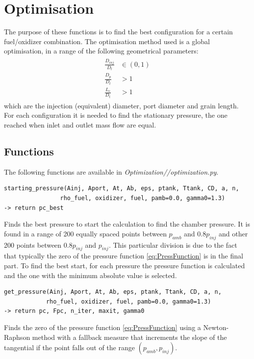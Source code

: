 \newpage
\chapter{Optimisation}
The purpose of these functions is to find the best configuration for a certain fuel/oxidizer combination.
The optimisation method used is a global optimisation, in a range of the following geometrical parameters:
\begin{gather}
\begin{align}
	\frac{D_{inj}}{D_t} &\in (0,1)\\
	\frac{D_{p}}{D_t} &> 1\\
	\frac{L_c}{D_t} &> 1
\end{align}
\end{gather}
which are the injection (equivalent) diameter, port diameter and grain length.\\
For each configuration it is needed to find the stationary pressure, the one reached when inlet and
outlet mass flow are equal.
\section{Functions}
The following functions are available in \textit{Optimization//optimization.py}.
\begin{verbatim}
starting_pressure(Ainj, Aport, At, Ab, eps, ptank, Ttank, CD, a, n, 
				rho_fuel, oxidizer, fuel, pamb=0.0, gamma0=1.3)
-> return pc_best
\end{verbatim}
\hspace{2em} Finds the best pressure to start the calculation to find the chamber pressure.
It is found in a range of 200 equally spaced points between $p_{amb}$ and $0.8p_{inj}$
and other 200 points between $0.8p_{inj}$ and $p_{inj}$. This particular division is due to the fact that
typically the zero of the pressure function \ref{eq:PressFunction} is in the final part.
To find the best start, for each pressure the pressure function is calculated and the one with the minimum absolute value is selected.

\begin{verbatim}
get_pressure(Ainj, Aport, At, Ab, eps, ptank, Ttank, CD, a, n, 
			rho_fuel, oxidizer, fuel, pamb=0.0, gamma0=1.3)
-> return pc, Fpc, n_iter, maxit, gamma0
\end{verbatim}
\hspace{2em} Finds the zero of the pressure function \ref{eq:PressFunction} using a Newton-Raphson method
with a fallback measure that increments the slope of the tangential if the point falls out of the range $(p_{amb},p_{inj})$.

